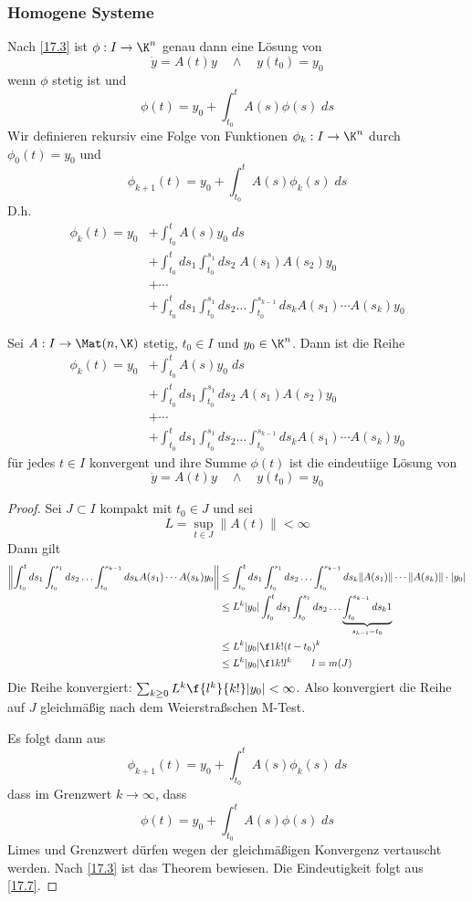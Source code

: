 \documentclass[a4paper,10pt]{scrartcl}
\begin{document}
\subsubsection{Homogene Systeme}

Nach \ref{17.3} ist $\phi:I \to \K^n$ genau dann eine Lösung von
\[
	\dot y = A(t) y  \quad \land\quad y(t_0) = y_0
\]
wenn $\phi$ stetig ist und
\[
	\phi(t) = y_0 + \int_{t_0}^t A(s) \phi(s)\; ds
\]
Wir definieren rekursiv eine Folge von Funktionen $\phi_k: I \to \K^n$ durch $\phi_0(t) = y_0$ und
\[
	\phi_{k+1}(t) = y_0 + \int_{t_0}^tA(s)\phi_k(s) \;ds
\]
D.h.
\begin{align*}
	\phi_k(t) = y_0 &+ \int_{t_0}^tA(s)y_0\;ds \\
					&+ \int_{t_0}^tds_1\int_{t_0}^{s_1}ds_2 \; A(s_1)A(s_2)y_0 \\
		&+ \dotsb \\
	 &+ \int_{t_0}^tds_1 \int_{t_0}^{s_1}ds_2 \dotso \int_{t_0}^{s_{k-1}}ds_k A(s_1)\dotsb A(s_k)y_0
\end{align*}

\begin{thm}
	\label{17.8}
	Sei $A:I \to\Mat(n,\K)$ stetig, $t_0\in I$ und $y_0\in \K^n$. 
	Dann ist die Reihe 
	\begin{align*}
		\phi_k(t) = y_0 &+ \int_{t_0}^tA(s)y_0\;ds \\
						&+ \int_{t_0}^tds_1\int_{t_0}^{s_1}ds_2 \; A(s_1)A(s_2)y_0 \\
			&+ \dotsb \\
		 &+ \int_{t_0}^tds_1 \int_{t_0}^{s_1}ds_2 \dotso \int_{t_0}^{s_{k-1}}ds_k A(s_1)\dotsb A(s_k)y_0
	\end{align*}
	für jedes $t\in I$ konvergent und ihre Summe $\phi(t)$ ist die eindeutiige Lösung von 
	\[
		\dot y = A(t) y  \quad \land\quad y(t_0) = y_0
	\]
	\begin{proof}
		Sei $J\subset I$ kompakt mit $t_0\in J$ und sei
		\[
			L = \sup_{t\in J}\|A(t)\| < \infty
		\]
		Dann gilt
		\begin{align*}
			\left\|\int_{t_0}^t ds_1 \int_{t_0}^{s_1}ds_2 \dotso \int_{t_0}^{s_{k-1}}ds_k A(s_1) \dotsb A(s_k) y_0\right\|
			& \le \int_{t_0}^t ds_1 \int_{t_0}^{s_1}ds_2 \dotso \int_{t_0}^{s_{k-1}}ds_k \|A(s_1)\|\dotsb \|A(s_k)\|\cdot |y_0|\\
			& \le L^k|y_0| 	\int_{t_0}^t ds_1 \int_{t_0}^{s_1}ds_2 \dotso \underbrace{\int_{t_0}^{s_{k-1}}ds_k 1}_{s_{k-1}-t_0}\\ 
			& \le L^k|y_0| \f 1{k!}(t-t_0)^k\\
			& \le L^k|y_0| \f 1{k!} l^k \qquad l = m(J)
		\end{align*}
		Die Reihe konvergiert: $\sum_{k\ge 0}L^k \f{l^k}{k!}|y_0| < \infty$.
		Also konvergiert die Reihe auf $J$ gleichmäßig nach dem Weierstraßschen M-Test.

		Es folgt dann aus
		\[
			\phi_{k+1}(t) = y_0 + \int_{t_0}^t A(s) \phi_{k}(s) \;ds
		\]
		dass im Grenzwert $k\to \infty$, dass
		\[
			\phi(t) = y_0 + \int_{t_0}^t A(s) \phi(s)\; ds
		\]
		Limes und Grenzwert dürfen wegen der gleichmäßigen Konvergenz vertauscht werden.
		Nach \ref{17.3} ist das Theorem bewiesen.
		Die Eindeutigkeit folgt aus \ref{17.7}.
	\end{proof}
\end{thm}
\end{document}
